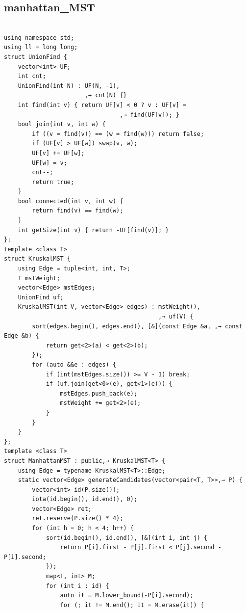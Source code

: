 \documentclass[9pt, landscape, a4paper,twosided]{extarticle}
\begin{document}
\begin{multicols*}{3}
\subsection{manhattan\_MST}
\begin{verbatim}

using namespace std;
using ll = long long;
struct UnionFind {
    vector<int> UF;
    int cnt;
    UnionFind(int N) : UF(N, -1),
                       ,→ cnt(N) {}
    int find(int v) { return UF[v] < 0 ? v : UF[v] =
                                 ,→ find(UF[v]); }
    bool join(int v, int w) {
        if ((v = find(v)) == (w = find(w))) return false;
        if (UF[v] > UF[w]) swap(v, w);
        UF[v] += UF[w];
        UF[w] = v;
        cnt--;
        return true;
    }
    bool connected(int v, int w) {
        return find(v) == find(w);
    }
    int getSize(int v) { return -UF[find(v)]; }
};
template <class T>
struct KruskalMST {
    using Edge = tuple<int, int, T>;
    T mstWeight;
    vector<Edge> mstEdges;
    UnionFind uf;
    KruskalMST(int V, vector<Edge> edges) : mstWeight(),
                                            ,→ uf(V) {
        sort(edges.begin(), edges.end(), [&](const Edge &a, ,→ const Edge &b) {
            return get<2>(a) < get<2>(b);
        });
        for (auto &&e : edges) {
            if (int(mstEdges.size()) >= V - 1) break;
            if (uf.join(get<0>(e), get<1>(e))) {
                mstEdges.push_back(e);
                mstWeight += get<2>(e);
            }
        }
    }
};
template <class T>
struct ManhattanMST : public,→ KruskalMST<T> {
    using Edge = typename KruskalMST<T>::Edge;
    static vector<Edge> generateCandidates(vector<pair<T, T>>,→ P) {
        vector<int> id(P.size());
        iota(id.begin(), id.end(), 0);
        vector<Edge> ret;
        ret.reserve(P.size() * 4);
        for (int h = 0; h < 4; h++) {
            sort(id.begin(), id.end(), [&](int i, int j) {
                return P[i].first - P[j].first < P[j].second - P[i].second;
            });
            map<T, int> M;
            for (int i : id) {
                auto it = M.lower_bound(-P[i].second);
                for (; it != M.end(); it = M.erase(it)) {

\end{verbatim}
\end{multicols*}
\end{document}

